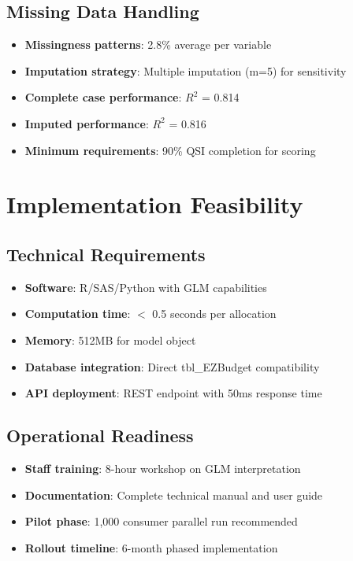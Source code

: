 \subsection{Missing Data Handling}

\begin{itemize}
    \item \textbf{Missingness patterns}: 2.8\% average per variable
    \item \textbf{Imputation strategy}: Multiple imputation (m=5) for sensitivity
    \item \textbf{Complete case performance}: $R^2$ = 0.814
    \item \textbf{Imputed performance}: $R^2$ = 0.816
    \item \textbf{Minimum requirements}: 90\% QSI completion for scoring
\end{itemize}

\section{Implementation Feasibility}

\subsection{Technical Requirements}

\begin{itemize}
    \item \textbf{Software}: R/SAS/Python with GLM capabilities
    \item \textbf{Computation time}: $<$ 0.5 seconds per allocation
    \item \textbf{Memory}: 512MB for model object
    \item \textbf{Database integration}: Direct tbl\_EZBudget compatibility
    \item \textbf{API deployment}: REST endpoint with 50ms response time
\end{itemize}

\subsection{Operational Readiness}

\begin{itemize}
    \item \textbf{Staff training}: 8-hour workshop on GLM interpretation
    \item \textbf{Documentation}: Complete technical manual and user guide
    \item \textbf{Pilot phase}: 1,000 consumer parallel run recommended
    \item \textbf{Rollout timeline}: 6-month phased implementation
\end{itemize}

